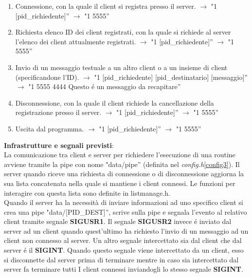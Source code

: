\documentclass[a4paper]{article}
\begin{document}
\begin{enumerate}
\item Connessione, con la quale il client si registra presso il server. $\rightarrow$ "1 [pid\_richiedente]” $\rightarrow$ "1 5555”

\item Richiesta elenco ID dei client registrati, con la quale si richiede al server l'elenco dei client attualmente registrati. $\rightarrow$ "1 [pid\_richiedente]” $\rightarrow$ "1 5555”

\item Invio di un messaggio testuale a un altro client o a un insieme di client (specificandone l'ID). $\rightarrow$ "1 [pid\_richiedente] [pid\_destinatario] [messaggio]” $\rightarrow$ "1 5555 4444 Questo \'e un messaggio da recapitare”

\item Disconnessione, con la quale il client richiede la cancellazione della registrazione presso il server. $\rightarrow$ "1 [pid\_richiedente]” $\rightarrow$ "1 5555”

\item Uscita dal programma. $\rightarrow$ "1 [pid\_richiedente]” $\rightarrow$ "1 5555”

\end{enumerate}
\vspace{0.2cm}
\textbf{Infrastrutture e segnali previsti}: \\
La comunicazione tra client e server per richiedere l’esecuzione di una routine avviene tramite la pipe con nome "data/pipe” (definita nel \textit{config.h}\ref{config3}).
Il server quando riceve una richiesta di connessione o di disconnessione aggiorna la sua lista concatenata nella quale si mantiene i client connessi. Le funzioni per interagire con questa lista sono definite in listmanage.h.\\
Quando il server ha la necessità di inviare informazioni ad uno specifico client si crea una pipe "data/[PID\_DEST]”, scrive sulla pipe e segnala l’evento al relativo client tramite segnale \textbf{SIGUSR1}.
Il segnale \textbf{SIGUSR2} invece \'e inviato dal server ad un client quando quest’ultimo ha richiesto l’invio di un messaggio ad un client non connesso al server.
Un altro segnale intercettato sia dal client che dal server \'e il \textbf{SIGINT}. Quando questo segnale viene intercettato da un client, esso si disconnette dal server prima di terminare mentre in caso sia intercettato dal server fa terminare tutti I client connessi inviandogli lo stesso segnale \textbf{SIGINT}.
\end{document}
